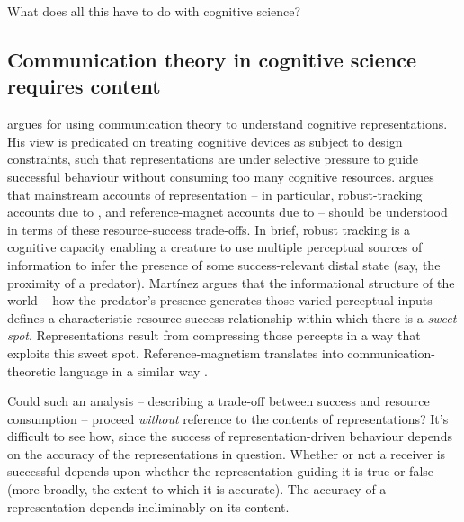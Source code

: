 \documentclass[12pt]{article}
\begin{document}
What does all this have to do with cognitive science?

\subsection{Communication theory in cognitive science requires content}

\citet{martinez2019deception,martinez2019representations} argues for using communication theory to understand cognitive representations.
His view is predicated on treating cognitive devices as subject to design constraints, such that representations are under selective pressure to guide successful behaviour without consuming too many cognitive resources.
\citet{martinez2019representations} argues that mainstream accounts of representation -- in particular, robust-tracking accounts due to \citet{sterelny2003thought,burge2010origins}, and reference-magnet accounts due to \citet{ryder2004sinbad,lewis1984putnam} -- should be understood in terms of these resource-success trade-offs.
In brief, robust tracking is a cognitive capacity enabling a creature to use multiple perceptual sources of information to infer the presence of some success-relevant distal state (say, the proximity of a predator).
Mart\'{i}nez argues that the informational structure of the world -- how the predator's presence generates those varied perceptual inputs -- defines a characteristic resource-success relationship within which there is a \textit{sweet spot}.
Representations result from compressing those percepts in a way that exploits this sweet spot.
Reference-magnetism translates into communication-theoretic language in a similar way \citep[1223]{martinez2019representations}.

Could such an analysis -- describing a trade-off between success and resource consumption -- proceed \textit{without} reference to the contents of representations?
It's difficult to see how, since the success of representation-driven behaviour depends on the accuracy of the representations in question.
Whether or not a receiver is successful depends upon whether the representation guiding it is true or false (more broadly, the extent to which it is accurate).
The accuracy of a representation depends ineliminably on its content.
\end{document}
